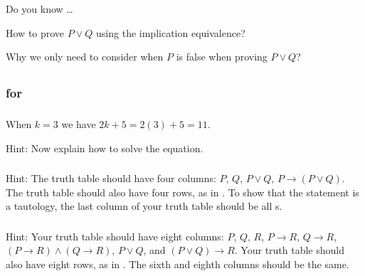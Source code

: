 \begin{exer}[\exerR] %
\label{exer_dyk_pfforimplication}
    Do you know \ldots
        \begin{exerpart}
             \item How to prove $P \lor Q$ using the implication equivalence?
             \item Why we only need to consider when $P$ is false when proving $P \lor Q$?
        \end{exerpart}
\end{exer}

\subsection{\answers}

\subsubsection{\answers for  \subifthen}

\subsubsection*{ \answers}
\begin{apart}
    \item When $k=3$ we have $2k+5 = 2(3) + 5 = 11$.
    \item Hint: Now explain how to solve the equation.
\end{apart}

\subsubsection*{ \answers}
Hint: The truth table should have four columns: $P$, $Q$, $P \lor Q$, $P \to (P \lor Q)$.  The truth table should also have four rows, as in .  To show that the statement is a tautology, the last column of your truth table should be all s.

\subsubsection*{ \answers}
Hint: Your truth table should have eight columns: $P$, $Q$, $R$, $P \to R$, $Q \to R$, $(P \to R) \land (Q \to R)$, $P \lor Q$, and $(P \lor Q) \to R$.  Your truth table should also have eight rows, as in .  The sixth and eighth columns should be the same.

